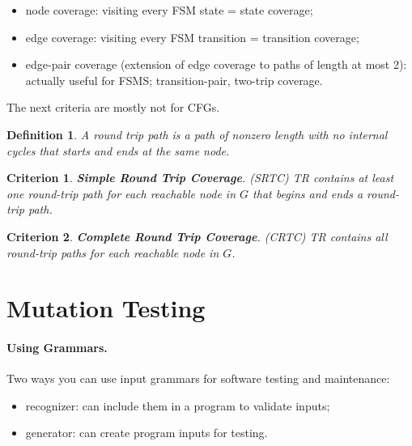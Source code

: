 \documentclass[11pt]{article}
\newtheorem{defn}{Definition}
\newtheorem{crit}{Criterion}
\begin{document}
\begin{itemize}[noitemsep]
\item node coverage: visiting every FSM state = state coverage;
\item edge coverage: visiting every FSM transition = transition coverage;
\item edge-pair coverage (extension of edge coverage to paths of length at most 2): actually useful for FSMS; transition-pair, two-trip coverage.
\end{itemize}

The next criteria are mostly not for CFGs.
\begin{defn}
A \emph{round trip} path is a path of nonzero length with no internal cycles that starts
and ends at the same node.
\end{defn}

\begin{crit}
{\bf Simple Round Trip Coverage}. (SRTC) \emph{TR} contains at least one
round-trip path for each reachable node in $G$ that begins and ends a
round-trip path.
\end{crit}

\begin{crit}
{\bf Complete Round Trip Coverage}. (CRTC) \emph{TR} contains all round-trip
paths for each reachable node in $G$.
\end{crit}

\newpage

\section*{Mutation Testing}

\paragraph{Using Grammars.} Two ways you can use input grammars for
software testing and maintenance:
\begin{itemize}[noitemsep]
\item recognizer: can include them in a program to validate inputs;
\item generator: can create program inputs for testing.
\end{itemize}
\end{document}
